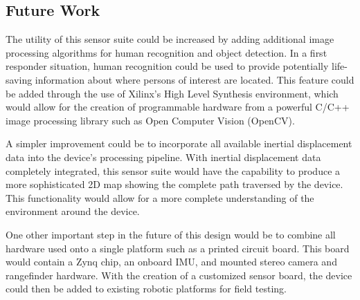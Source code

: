 \subsection{Future Work}
The utility of this sensor suite could be increased by adding additional image processing algorithms for human recognition and object detection.  In a first responder situation, human recognition could be used to provide potentially life-saving information about where persons of interest are located. This feature could be added through the use of Xilinx’s High Level Synthesis environment, which would allow for the creation of programmable hardware from a powerful C/C++ image processing library such as Open Computer Vision (OpenCV).
\par
A simpler improvement could be to incorporate all available inertial displacement data into the device’s processing pipeline. With inertial displacement data completely integrated, this sensor suite would have the capability to produce a more sophisticated 2D map showing the complete path traversed by the device. This functionality would allow for a more complete understanding of the environment around the device.
\par
One other important step in the future of this design would be to combine all hardware used onto a single platform such as a printed circuit board. This board would contain a Zynq chip, an onboard IMU, and mounted stereo camera and rangefinder hardware. With the creation of a customized sensor board, the device could then be added to existing robotic platforms for field testing. 